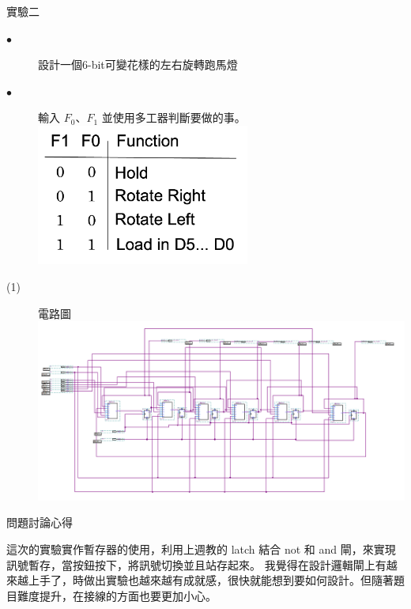 \documentclass[12pt, a4paper]{article}
\begin{document}
\begin{description}
\begin{description}
          \fontsize{20pt}{22pt}\selectfont
          \item 實驗二
          \fontsize{16pt}{18pt}\selectfont
            \begin{description}
              \item [$\bullet$] 設計一個6-bit可變花樣的左右旋轉跑馬燈
              \item [$\bullet$] 輸入 $F_{0}$、$F_{1}$ 並使用多工器判斷要做的事。 \\
                \includegraphics[width=7cm]{./image/ex2_4to1.png}
              \fontsize{18pt}{20pt}
                \item [(1)]電路圖 \\[.3cm]
                  \includegraphics[width=13cm]{./image/ex2.PNG} \\
            \end{description}
          \normalsize
        \normalsize
      \end{description}
    \item [三、]問題討論心得 \\[.6cm]
      \begin{minipage}[t]{\linewidth}
        \fontsize{16}{18}\selectfont
            這次的實驗實作暫存器的使用，利用上週教的 latch 結合 not 和 and 閘，來實現訊號暫存，當按鈕按下，將訊號切換並且站存起來。
            我覺得在設計邏輯閘上有越來越上手了，時做出實驗也越來越有成就感，很快就能想到要如何設計。但隨著題目難度提升，在接線的方面也要更加小心。
        \normalsize  
      \end{minipage}
  \normalsize
\end{description}
\end{document}

